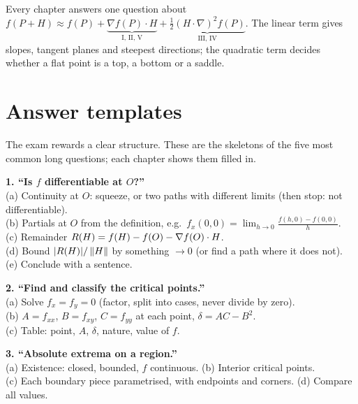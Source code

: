 \begin{remember}
Every chapter answers one question about
$\displaystyle f(P+H)\approx f(P)+\underbrace{\nabla f(P)\cdot H}_{\text{I, II, V}}+\underbrace{\tfrac12(H\cdot\nabla)^2f(P)}_{\text{III, IV}}$.
The linear term gives slopes, tangent planes and steepest directions; the quadratic term
decides whether a flat point is a top, a bottom or a saddle.
\end{remember}

\clearpage
\section*{Answer templates}

The exam rewards a clear structure. These are the skeletons of the five most common long
questions; each chapter shows them filled in.

\begin{method}
\textbf{1. ``Is $f$ differentiable at $O$?''}\\
(a) Continuity at $O$: squeeze, or two paths with different limits (then stop: not differentiable).\\
(b) Partials at $O$ from the definition, e.g.\ $f_x(0,0)=\lim_{h\to0}\frac{f(h,0)-f(0,0)}{h}$.\\
(c) Remainder $R(H)=f(H)-f(O)-\nabla f(O)\cdot H$.\\
(d) Bound $|R(H)|/\left\lVert H\right\rVert$ by something $\to0$ (or find a path where it does not).\\
(e) Conclude with a sentence.
\end{method}

\begin{method}
\textbf{2. ``Find and classify the critical points.''}\\
(a) Solve $f_x=f_y=0$ (factor, split into cases, never divide by zero).\\
(b) $A=f_{xx}$, $B=f_{xy}$, $C=f_{yy}$ at each point, $\delta=AC-B^2$.\\
(c) Table: point, $A$, $\delta$, nature, value of $f$.
\end{method}

\begin{method}
\textbf{3. ``Absolute extrema on a region.''}\\
(a) Existence: closed, bounded, $f$ continuous. (b) Interior critical points.\\
(c) Each boundary piece parametrised, with endpoints and corners. (d) Compare all values.
\end{method}

